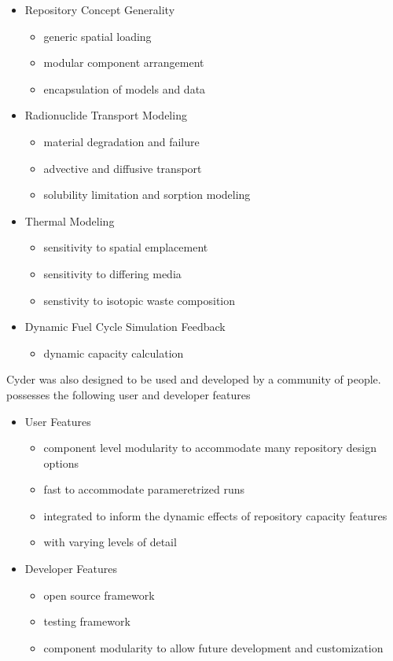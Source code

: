 \begin{itemize}
  \item Repository Concept Generality
    \begin{itemize}
      \item generic spatial loading
      \item modular component arrangement
      \item encapsulation of models and data
    \end{itemize}
  \item Radionuclide Transport Modeling 
    \begin{itemize}
      \item material degradation and failure
      \item advective and diffusive transport
      \item solubility limitation and sorption modeling
    \end{itemize}
  \item Thermal Modeling
    \begin{itemize}
      \item sensitivity to spatial emplacement
      \item sensitivity to differing media
      \item senstivity to isotopic waste composition
    \end{itemize}
  \item Dynamic Fuel Cycle Simulation Feedback
    \begin{itemize}
      \item dynamic capacity calculation
    \end{itemize}
\end{itemize}

Cyder was also designed to be used and developed by a community of people. \Cyder possesses the following user and developer features
\begin{itemize}
  \item User Features
    \begin{itemize}
      \item component level modularity to accommodate many repository design options
      \item fast to accommodate parameretrized runs
      \item integrated to inform the dynamic effects of repository capacity features
      \item with varying levels of detail
    \end{itemize}
  \item Developer Features
    \begin{itemize}
      \item open source framework
      \item testing framework
      \item component modularity to allow future development and customization
    \end{itemize}
\end{itemize}

